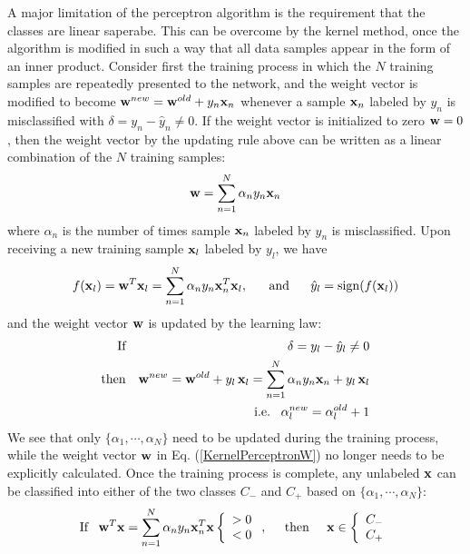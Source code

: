 \documentclass{article}
\DeclareMathOperator{\sign}{sign}
\begin{document}
A major limitation of the perceptron algorithm is the requirement that
the classes are linear saperabe. This can be overcome by the kernel
method, once the algorithm is modified in such a way that all data 
samples appear in the form of an inner product. Consider first the 
training process in which the $N$ training samples are repeatedly 
presented to the network, and the weight vector is modified to become 
${\bf w}^{new}={\bf w}^{old}+y_n{\bf x}_n$ whenever a sample ${\bf x}_n$ 
labeled by $y_n$ is misclassified with $\delta=y_n-\hat{y}_n\ne 0$. If 
the weight vector is initialized to zero ${\bf w}=0$, then the weight 
vector by the updating rule above can be written as a linear combination
of the $N$ training samples:
\begin{equation}
  {\bf w}=\sum_{n=1}^N \alpha_n y_n {\bf x}_n
  \label{KernelPerceptronW}
\end{equation}
where $\alpha_n$ is the number of times sample ${\bf x}_n$ labeled by 
$y_n$ is misclassified. Upon receiving a new training sample ${\bf x}_l$
labeled by $y_l$, we have
\begin{equation}
  f({\bf x}_l)= {\bf w}^T{\bf x}_l=\sum_{n=1}^N \alpha_n y_n {\bf x}_n^T{\bf x}_l,
  \;\;\;\;\;\;\mbox{and}\;\;\;\;\;\;  \hat{y}_l=\sign(f({\bf x}_l))
\end{equation}
and the weight vector ${\bf w}$ is updated by the learning law:
\begin{eqnarray}
  \mbox{If} & & \;\;\delta=y_l-\hat{y}_l \ne 0
  \nonumber \\
  \mbox{then} & & {\bf w}^{new}={\bf w}^{old}+ y_l\, {\bf x}_l
  =\sum_{n=1}^N \alpha_n y_n {\bf x}_n+ y_l\, {\bf x}_l
  \nonumber \\
  & & \;\;\;\mbox{i.e.}  \;\;\; \alpha_l^{new}=\alpha_l^{old}+1
\end{eqnarray}
We see that only $\{\alpha_1,\cdots,\alpha_N\}$ need to be updated 
during the training process, while the weight vector ${\bf w}$ in Eq. 
(\ref{KernelPerceptronW}) no longer needs to be explicitly calculated.
Once the training process is complete, any unlabeled ${\bf x}$ can be
classified into either of the two classes $C_-$ and $C_+$ based on 
$\{\alpha_1,\cdots,\alpha_N\}$:
\begin{equation}
  \mbox{If}\;\;\; {\bf w}^T{\bf x}=\sum_{n=1}^N \alpha_n y_n {\bf x}_n^T{\bf x}
  \left\{\begin{array}{l} >0\\<0\end{array}\right.,
  \;\;\;\;\;\mbox{then}\;\;\;\;\;
  {\bf x}\in\left\{\begin{array}{l}C_-\\C_+\end{array}\right.
\end{equation}
\end{document}
